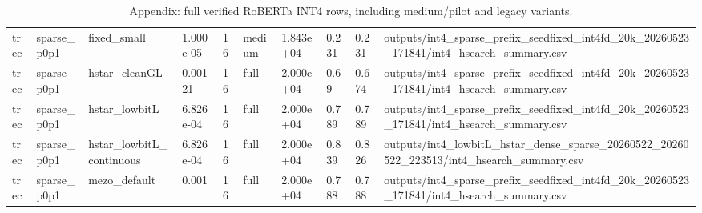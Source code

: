 \begin{table}[t]
\begin{tabular}{llllllllll}
trec & sparse\_p0p1 & fixed\_small & 1.000e-05 & 16 & medium & 1.843e+04 & 0.231 & 0.231 & outputs/int4\_sparse\_prefix\_seedfixed\_int4fd\_20k\_20260523\_171841/int4\_hsearch\_summary.csv \\
trec & sparse\_p0p1 & hstar\_cleanGL & 0.00121 & 16 & full & 2.000e+04 & 0.69 & 0.674 & outputs/int4\_sparse\_prefix\_seedfixed\_int4fd\_20k\_20260523\_171841/int4\_hsearch\_summary.csv \\
trec & sparse\_p0p1 & hstar\_lowbitL & 6.826e-04 & 16 & full & 2.000e+04 & 0.789 & 0.789 & outputs/int4\_sparse\_prefix\_seedfixed\_int4fd\_20k\_20260523\_171841/int4\_hsearch\_summary.csv \\
trec & sparse\_p0p1 & hstar\_lowbitL\_continuous & 6.826e-04 & 16 & full & 2.000e+04 & 0.839 & 0.826 & outputs/int4\_lowbitL\_hstar\_dense\_sparse\_20260522\_20260522\_223513/int4\_hsearch\_summary.csv \\
trec & sparse\_p0p1 & mezo\_default & 0.001 & 16 & full & 2.000e+04 & 0.788 & 0.788 & outputs/int4\_sparse\_prefix\_seedfixed\_int4fd\_20k\_20260523\_171841/int4\_hsearch\_summary.csv \\
\bottomrule
\end{tabular}
\caption{Appendix: full verified RoBERTa INT4 rows, including medium/pilot and legacy variants.}
\label{tab:roberta_multitask_appendix}
\end{table}
